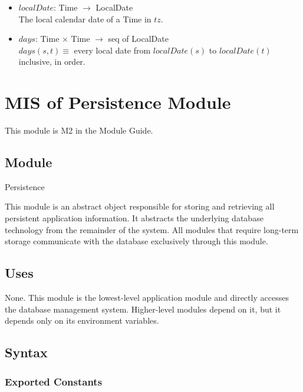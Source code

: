 \documentclass[12pt, titlepage]{article}
\begin{document}
\begin{itemize}
  the same time counted once (PR-PA-03). It satisfies
  \[
  \max_{o} \mathit{appTotal}(R, o, d) \leq \mathit{dayTotal}(R, d) \leq
  \sum_{o} \mathit{appTotal}(R, o, d)
  \]
  up to rounding. How overlapping records are combined is a secret of this
  module (see the Module Guide).
\item $\mathit{localDate}$: Time $\rightarrow$ LocalDate\\
  The local calendar date of a Time in $\mathit{tz}$.
\item $\mathit{days}$: Time $\times$ Time $\rightarrow$ seq of LocalDate\\
  $\mathit{days}(s, t) \equiv$ every local date from $\mathit{localDate}(s)$
  to $\mathit{localDate}(t)$ inclusive, in order.
\end{itemize}

\section{MIS of Persistence Module} \label{misPer}

This module is M2 in the Module Guide.

\subsection{Module}

Persistence

\medskip

\noindent This module is an abstract object responsible for storing and retrieving all persistent application information. It abstracts the underlying database technology from the remainder of the system. All modules that require long-term storage communicate with the database exclusively through this module.

\subsection{Uses}

None. This module is the lowest-level application module and directly accesses the database management system. Higher-level modules depend on it, but it depends only on its environment variables.

\subsection{Syntax}

\subsubsection{Exported Constants}
\end{document}
